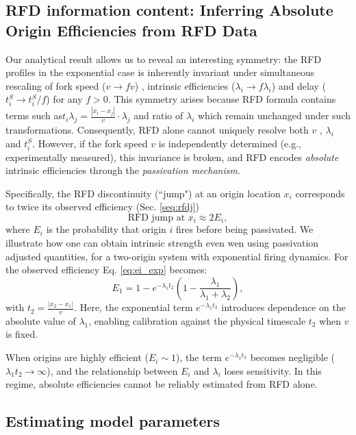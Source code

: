 \documentclass[10pt,a4paper]{revtex4-2}
\begin{document}
\subsection{RFD information content: Inferring Absolute Origin Efficiencies from RFD Data}

Our analytical result allows us to reveal an interesting symmetry:
the RFD profiles in the exponential case is inherently invariant under simultaneous rescaling of 
fork speed (\(v \to fv\)) , intrinsic efficiencies (\(\lambda_i \to f\lambda_i\)) and
 delay (\(t_i^S \to t_i^S/f\)) for any \(f > 0\). 
 This symmetry arises because RFD formula contains terms such as\(t_i \lambda_j = \frac{|x_i - x_j|}{v} \cdot \lambda_j\) and 
ratio of $\lambda_i$ which remain unchanged under such transformations. 
Consequently, RFD alone cannot uniquely resolve both \(v\) , \(\lambda_i\) and $t_i^S$. 
However, if the fork speed \(v\) is independently determined (e.g., experimentally measured), 
this invariance is broken, and RFD encodes \textit{absolute} intrinsic efficiencies through 
the \textit{passivation mechanism}. 

Specifically, the RFD discontinuity (``jump") at an origin location \(x_i\) corresponds to twice its observed efficiency (Sec. \ref{seq:rfdj})
\begin{equation}
\text{RFD jump at } x_i \approx 2E_i,
\end{equation}
where \(E_i\) is the probability that origin \(i\) fires before being passivated. 
We illustrate how one can obtain intrinsic strength even wen using passivation adjusted quantities,
for a two-origin system with exponential firing dynamics. For the observed efficiency Eq. \ref{eq:ei_exp} becomes:
\begin{equation}
E_1 = 1 - e^{-\lambda_1 t_2} \left(1 - \frac{\lambda_1}{\lambda_1 + \lambda_2}\right),
\end{equation}
with \(t_2 = \frac{|x_2 - x_1|}{v}\). Here, the exponential term \(e^{-\lambda_1 t_2}\) introduces 
dependence on the absolute value of \(\lambda_1\), enabling calibration against the physical 
timescale \(t_2\) when \(v\) is fixed.

When origins are highly efficient (\(E_i \sim 1\)), the term \(e^{-\lambda_1 t_2}\) becomes negligible
 (\(\lambda_1 t_2 \to \infty\)), and the relationship between \(E_i\) and \(\lambda_i\) loses sensitivity.
  In this regime, absolute efficiencies cannot be reliably estimated from RFD alone.

\subsection{Estimating model parameters}
\end{document}

